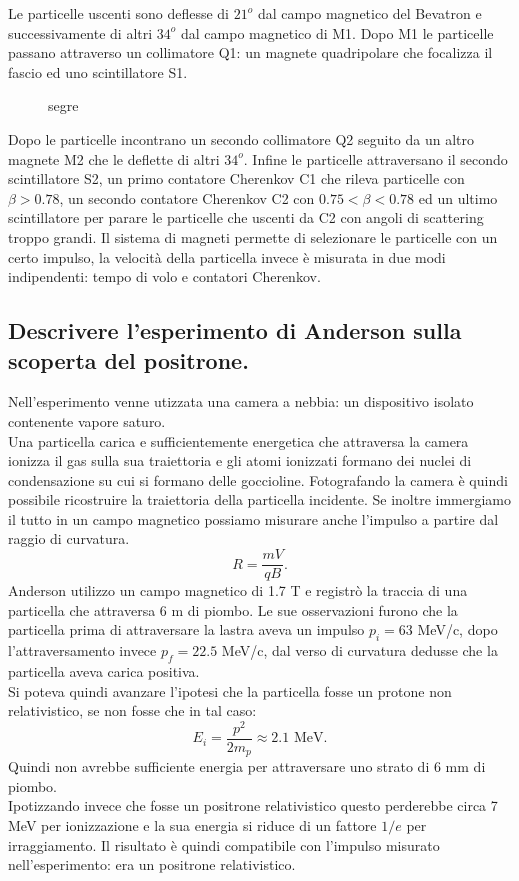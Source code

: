 Le particelle uscenti sono deflesse di $21^o$ dal campo magnetico del Bevatron e successivamente di altri $34^o$ dal campo magnetico di M1. Dopo M1 le particelle passano attraverso un collimatore Q1: un magnete quadripolare che focalizza il fascio ed uno scintillatore S1. 
\begin{figure}[H]
    \centering
    \caption{segre}
    \label{fig:segre}
\end{figure}
Dopo le particelle incontrano un secondo collimatore Q2 seguito da un altro magnete M2 che le deflette di altri $34^o$. Infine le particelle attraversano il secondo scintillatore S2, un primo contatore Cherenkov C1 che rileva particelle con $\beta>0.78$, un secondo contatore Cherenkov C2 con $0.75< \beta<0.78$ ed un ultimo scintillatore per parare le particelle che uscenti da C2 con angoli di scattering troppo grandi.
Il sistema di magneti permette di selezionare le particelle con un certo impulso, la velocità della particella invece è misurata in due modi indipendenti: tempo di volo e contatori Cherenkov.

\subsection[]{Descrivere l’esperimento di Anderson sulla scoperta del positrone.
}\label{sec:4.a.34}
Nell'esperimento venne utizzata una camera a nebbia: un dispositivo isolato contenente vapore saturo. \\ 
Una particella carica e sufficientemente energetica che attraversa la camera ionizza il gas sulla sua traiettoria e gli atomi ionizzati formano dei nuclei di condensazione su cui si formano delle goccioline. Fotografando la camera è quindi possibile ricostruire la traiettoria della particella incidente. Se inoltre immergiamo il tutto in un campo magnetico possiamo misurare anche l'impulso a partire dal raggio di curvatura.
\[
	R = \frac{mV}{qB}
.\] 
Anderson utilizzo un campo magnetico di 1.7 T e registrò la traccia di una particella che attraversa 6 m di piombo. Le sue osservazioni furono che la particella prima di attraversare la lastra aveva un impulso $p_{i}=63$ MeV/c, dopo l'attraversamento invece $p_{f}=22.5$ MeV/c, dal verso di curvatura dedusse che la particella aveva carica positiva.\\
Si poteva quindi avanzare l'ipotesi che la particella fosse un protone non relativistico, se non fosse che in tal caso:
\[
	E_{i}= \frac{p^2}{2m_{p}}\approx 2.1 \text{ MeV}
.\] 
Quindi non avrebbe sufficiente energia per attraversare uno strato di 6 mm di piombo.\\
Ipotizzando invece che fosse un positrone relativistico questo perderebbe circa 7 MeV per ionizzazione e la sua energia si riduce di un fattore $1 /e$ per irraggiamento. Il risultato è quindi compatibile con l'impulso misurato nell'esperimento: era un positrone relativistico.

